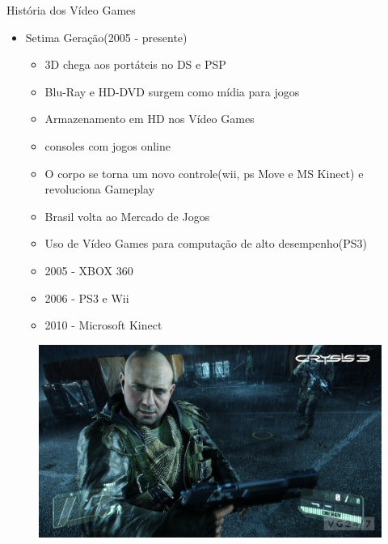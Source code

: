 \documentclass[xcolor=svgnames,handout]{beamer}
\begin{document}
\begin{frame}{História dos Vídeo Games}
\begin{itemize}
	\item Setima Geração(2005 - presente)\pause
	\begin{itemize}
		\item 3D chega aos portáteis no DS e PSP\pause
		\item Blu-Ray e HD-DVD surgem como mídia para jogos\pause
		\item Armazenamento em HD nos Vídeo Games\pause
		\item consoles com jogos online\pause
		\item O corpo se torna um novo controle(wii, ps Move e MS Kinect) e revoluciona Gameplay\pause
		\item Brasil volta ao Mercado de Jogos\pause
		\item Uso de Vídeo Games para computação de alto desempenho(PS3)\pause
		\item 2005 - XBOX 360\pause
		\item 2006 - PS3 e Wii\pause
		\item 2010 - Microsoft Kinect\pause
		\end{itemize}
		\end{itemize}
				\begin{figure}[t]
			    \centering
				    \includegraphics[scale=0.1]{imagens/c3}
				\end{figure}
\end{frame}
\end{document}
